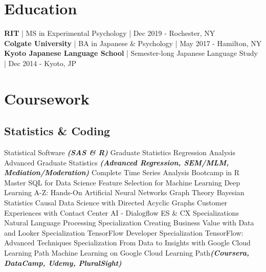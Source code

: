 \documentclass[letterpaper]{deedy-resume_sm} %
\begin{document}
\section{Education} 
\textbf{RIT} | MS in Experimental Psychology | Dec 2019 - Rochester, NY\\
\sectionspace %
\textbf{Colgate University} | BA in Japanese \& Psychology | May 2017 - Hamilton, NY\\
\sectionspace %
\textbf{Kyoto Japanese Language School} | Semester-long Japanese Language Study | Dec 2014 - Kyoto, JP\\
\sectionspace %

\section{Coursework}
\subsection{Statistics \& Coding}
Statistical Software \textbullet{} 
{\footnotesize \textit{\textbf{(SAS \& R) }}} \textbullet{} 
Graduate Statistics \textbullet{} 
Regression Analysis \textbullet{} 
Advanced Graduate Statistics \textbullet{} 
{\footnotesize \textit{\textbf{(Advanced Regression, SEM/MLM, Mediation/Moderation)}}}
\textbullet{} Complete Time Series Analysis Bootcamp in R \textbullet{} Master SQL for Data Science \textbullet{} Feature Selection for Machine Learning \textbullet{} Deep Learning A-Z: Hands-On Artificial Neural Networks \textbullet{} Graph Theory \textbullet{} Bayesian Statistics \textbullet{} Causal Data Science with Directed Acyclic Graphs \textbullet{} Customer Experiences with Contact Center AI - Dialogflow ES \& CX Specializations \textbullet{} Natural Language Processing Specialization \textbullet{} Creating Business Value with Data and Looker Specialization \textbullet{} TensorFlow Developer Specialization \textbullet{} TensorFlow: Advanced Techniques Specialization \textbullet{} From Data to Insights with Google Cloud Learning Path \textbullet{} Machine Learning on Google Cloud Learning Path{\footnotesize \textit{\textbf{(Coursera, DataCamp, Udemy, PluralSight)}}}
\sectionspace
\end{document}
